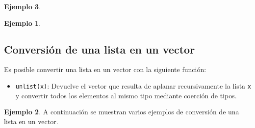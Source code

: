 \documentclass[
]{book}
\newenvironment{Shaded}{\begin{snugshade}}{\end{snugshade}}
\newcommand{\CommentTok}[1]{\textcolor[rgb]{0.56,0.35,0.01}{\textit{#1}}}
\newcommand{\DecValTok}[1]{\textcolor[rgb]{0.00,0.00,0.81}{#1}}
\newcommand{\FunctionTok}[1]{\textcolor[rgb]{0.00,0.00,0.00}{#1}}
\newcommand{\NormalTok}[1]{#1}
\newcommand{\OtherTok}[1]{\textcolor[rgb]{0.56,0.35,0.01}{#1}}
\newcommand{\SpecialCharTok}[1]{\textcolor[rgb]{0.00,0.00,0.00}{#1}}
\newcommand{\StringTok}[1]{\textcolor[rgb]{0.31,0.60,0.02}{#1}}
\providecommand{\tightlist}{%
  \setlength{\itemsep}{0pt}\setlength{\parskip}{0pt}}
\theoremstyle{definition}
\theoremstyle{definition}
\newtheorem{example}{Ejemplo}[chapter]
\theoremstyle{definition}
\theoremstyle{definition}
\theoremstyle{remark}
\begin{document}
\begin{example}
\begin{example}
\begin{Shaded}
\end{Shaded}

\end{example}

\hypertarget{conversiuxf3n-de-una-lista-en-un-vector}{%
\subsection{Conversión de una lista en un vector}\label{conversiuxf3n-de-una-lista-en-un-vector}}

Es posible convertir una lista en un vector con la siguiente función:

\begin{itemize}
\tightlist
\item
  \texttt{unlist(x)}: Devuelve el vector que resulta de aplanar recursivamente la lista \texttt{x} y convertir todos los elementos al mismo tipo mediante coerción de tipos.
\end{itemize}

\begin{example}

A continuación se muestran varios ejemplos de conversión de una lista en un vector.


\end{example}
\end{example}
\end{document}
